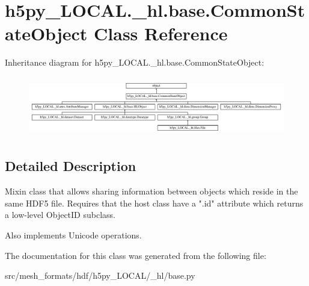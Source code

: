 \hypertarget{classh5py__LOCAL_1_1__hl_1_1base_1_1CommonStateObject}{}\section{h5py\+\_\+\+L\+O\+C\+A\+L.\+\_\+hl.\+base.\+Common\+State\+Object Class Reference}
\label{classh5py__LOCAL_1_1__hl_1_1base_1_1CommonStateObject}
Inheritance diagram for h5py\+\_\+\+L\+O\+C\+A\+L.\+\_\+hl.\+base.\+Common\+State\+Object\+:\begin{figure}[H]
\begin{center}
\leavevmode
\includegraphics[height=2.631579cm]{classh5py__LOCAL_1_1__hl_1_1base_1_1CommonStateObject}
\end{center}
\end{figure}


\subsection{Detailed Description}
\begin{DoxyVerb}    Mixin class that allows sharing information between objects which
    reside in the same HDF5 file.  Requires that the host class have
    a ".id" attribute which returns a low-level ObjectID subclass.

    Also implements Unicode operations.
\end{DoxyVerb}
 

The documentation for this class was generated from the following file\+:\begin{DoxyCompactItemize}
\item 
src/mesh\+\_\+formats/hdf/h5py\+\_\+\+L\+O\+C\+A\+L/\+\_\+hl/base.\+py\end{DoxyCompactItemize}
